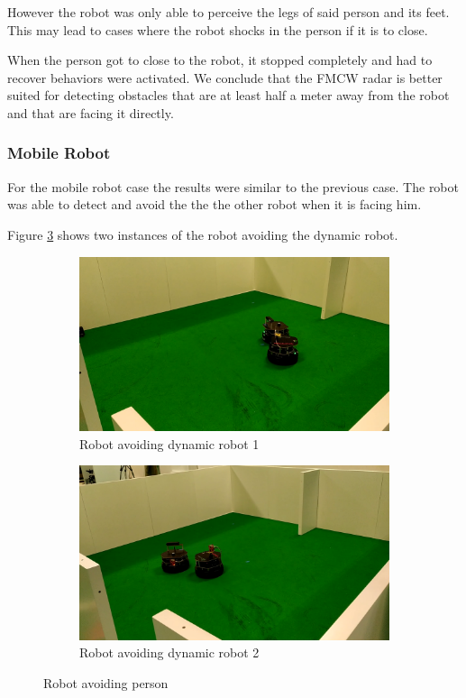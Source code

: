 However the robot was only able to perceive the legs of said person and its feet. This may lead to cases where the robot shocks in the person if it is to close.

When the person got to close to the robot, it stopped completely and had to recover behaviors were activated. We conclude that the \ac{FMCW} \ac{radar} is better suited for detecting obstacles that are at least half a meter away from the robot and that are facing it directly. 
\subsubsection{Mobile Robot}
For the mobile robot case the results were similar to the previous case. The robot was able to detect and avoid the the the other robot when it is facing him.

Figure \ref{fig:exp3robot} shows two instances of the robot avoiding the dynamic robot.
\begin{figure}[ht!]
  \centering
  \begin{subfigure}[b]{0.49\linewidth}
    \includegraphics[width=\linewidth]{imgs/chapter5/exp3robot1.png}
     \caption{Robot avoiding dynamic robot 1}
     \label{fig::exp3robot1}
  \end{subfigure}
  \begin{subfigure}[b]{0.49\linewidth}
    \includegraphics[width=\linewidth]{imgs/chapter5/exp3robot2.png}
    \caption{Robot avoiding dynamic robot 2}
    \label{fig::exp3robot2}
  \end{subfigure}
  \caption{Robot avoiding person }
  \label{fig:exp3robot}
\end{figure}

